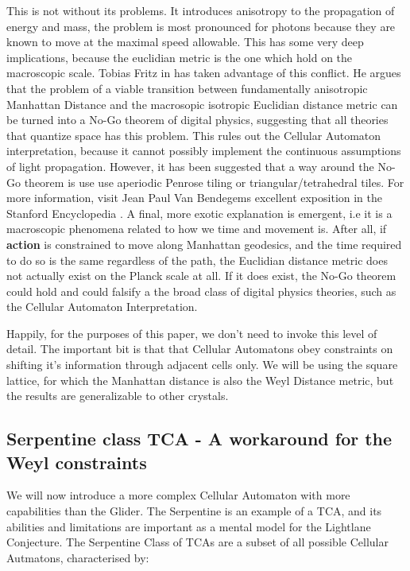 \documentclass[notitlepage]{article}
\begin{document}
This is not without its problems. It introduces anisotropy to the propagation of energy and mass, the problem is most pronounced for photons because they are known to move at the maximal speed allowable. This has some very deep implications, because the euclidian metric is the one which hold on the macroscopic scale. Tobias Fritz in  \cite{FritzNoGo} has taken advantage of this conflict. He argues that the problem of a viable transition between fundamentally anisotropic Manhattan Distance and the macrosopic isotropic Euclidian distance metric can be turned into a No-Go theorem of digital physics, suggesting that all theories that quantize space has this problem. This rules out the Cellular Automaton interpretation, because it cannot possibly implement the continuous assumptions of light propagation. However, it has been suggested that a way around the No-Go theorem is use use aperiodic Penrose tiling or triangular/tetrahedral tiles. For more information, visit Jean Paul Van Bendegems excellent exposition in the Stanford Encyclopedia \cite{stanford-geometry-finitism}. A final, more exotic explanation is emergent, i.e it is a macroscopic phenomena related to how we time and movement is. After all, if \textbf{action} is constrained to move along Manhattan geodesics, and the time required to do so is the same regardless of the path, the Euclidian distance metric does not actually exist on the Planck scale at all. If it does exist, the No-Go theorem could hold and could falsify a the broad class of digital physics theories, such as the Cellular Automaton Interpretation.

Happily, for the purposes of this paper, we don't need to invoke this level of detail. The important bit is that that Cellular Automatons obey constraints on shifting it's information through adjacent cells only. We will be using the square lattice, for which the Manhattan distance is also the Weyl Distance metric, but the results are generalizable to other crystals.

\subsection{Serpentine class TCA - A workaround for the Weyl constraints}
We will now introduce a more complex Cellular Automaton with more capabilities than the Glider. The Serpentine is an example of a TCA, and its abilities and limitations are important as a mental model for the Lightlane Conjecture. The Serpentine Class of TCAs are a subset of all possible Cellular Autmatons, characterised by:
\end{document}
